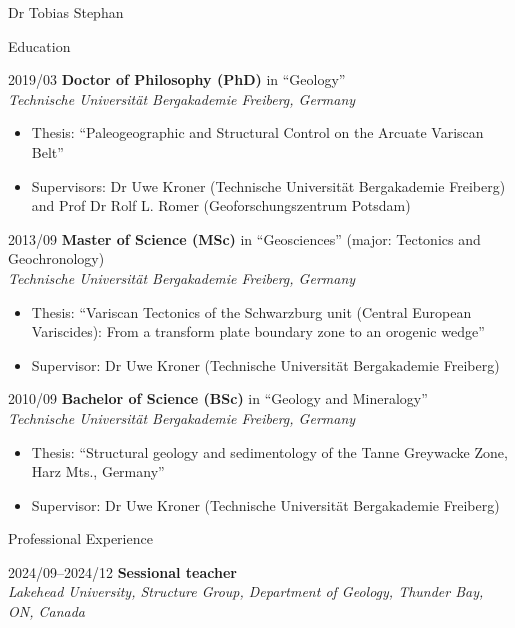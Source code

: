 \documentclass[10pt, paper=letter]{scrartcl} %
\begin{document}
\begin{cv}{Dr Tobias Stephan}
\begin{cvlist}{Education}
    \item[2019/03] \textbf{Doctor of Philosophy (PhD)} in \enquote{Geology}\\ \textit{Technische Universit\"at Bergakademie Freiberg, Germany}
        \begin{itemize}\setlength\itemsep{-0.5em}
        \item Thesis: \enquote{Paleogeographic and Structural Control on the Arcuate Variscan Belt}
        \item Supervisors: Dr Uwe Kroner (Technische Universit\"at Bergakademie Freiberg) and Prof Dr Rolf L. Romer (Geoforschungszentrum Potsdam)
        \end{itemize}
    \item[2013/09] \textbf{Master of Science (MSc)} in \enquote{Geosciences} (major: Tectonics and Geochronology)\\
    \textit{Technische Universit\"at Bergakademie Freiberg, Germany}
        \begin{itemize}\setlength\itemsep{-0.5em}
        \item Thesis: \enquote{Variscan Tectonics of the Schwarzburg unit (Central European Variscides): From a transform plate boundary zone to an orogenic wedge}
        \item Supervisor: Dr Uwe Kroner (Technische Universit\"at Bergakademie Freiberg)
        \end{itemize}
    \item[2010/09] \textbf{Bachelor of Science (BSc)} in \enquote{Geology and Mineralogy}\\
    \textit{Technische Universit\"at Bergakademie Freiberg, Germany}
        \begin{itemize}\setlength\itemsep{-0.5em}
        \item Thesis: \enquote{Structural geology and sedimentology of the Tanne Greywacke Zone, Harz Mts., Germany}
        \item Supervisor: Dr Uwe Kroner (Technische Universit\"at Bergakademie Freiberg)
        \end{itemize}	 	
\end{cvlist}

\begin{cvlist}{Professional Experience}
    \item[2024/09--2024/12] \textbf{Sessional teacher}\\
        \textit{Lakehead University, Structure Group, Department of Geology, Thunder Bay, ON, Canada}


\end{cvlist}
\end{cv}
\end{document}
